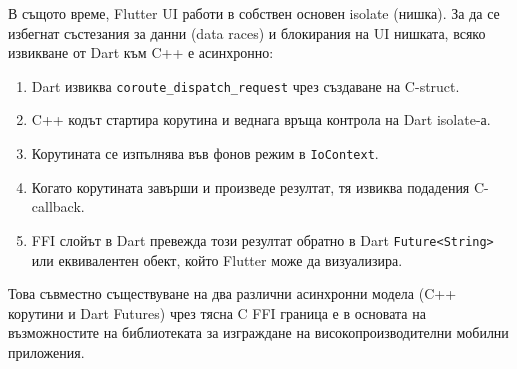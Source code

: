 В същото време, Flutter UI работи в собствен основен isolate (нишка). За да се избегнат състезания за данни (data races) и блокирания на UI нишката, всяко извикване от Dart към C++ е асинхронно: 
\begin{enumerate}
    \item Dart извиква \texttt{coroute\_dispatch\_request} чрез създаване на C-struct.
    \item C++ кодът стартира корутина и веднага връща контрола на Dart isolate-а.
    \item Корутината се изпълнява във фонов режим в \texttt{IoContext}.
    \item Когато корутината завърши и произведе резултат, тя извиква подадения C-callback.
    \item FFI слойът в Dart превежда този резултат обратно в Dart \texttt{Future<String>} или еквивалентен обект, който Flutter може да визуализира.
\end{enumerate}

Това съвместно съществуване на два различни асинхронни модела (C++ корутини и Dart Futures) чрез тясна C FFI граница е в основата на възможностите на библиотеката за изграждане на високопроизводителни мобилни приложения.
